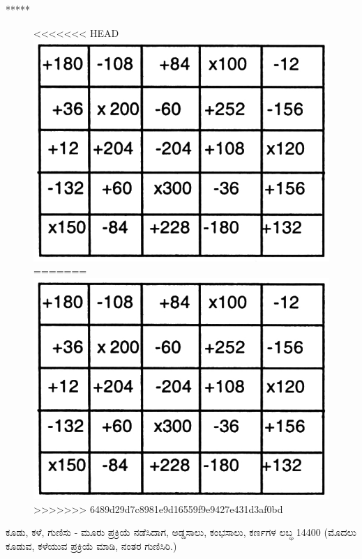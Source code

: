 \begin{center}
*****
\end{center}
\begin{figure}[H]
<<<<<<< HEAD
\includegraphics{src/figures/chap7/fig7-32.jpg}
=======
\includegraphics[scale=0.8]{src/figures/chap7/fig7.32.jpg}
>>>>>>> 6489d29d7c8981e9d16559f9e9427e431d3af0bd
\end{figure}
ಕೂಡು, ಕಳೆ, ಗುಣಿಸು - ಮೂರು ಪ್ರಕ್ರಿಯೆ ನಡೆಸಿದಾಗ, ಅಡ್ಡಸಾಲು, ಕಂಭಸಾಲು, ಕರ್ಣಗಳ ಲಬ್ಧ 14400 (ಮೊದಲು ಕೂಡುವ, ಕಳೆಯುವ ಪ್ರಕ್ರಿಯೆ ಮಾಡಿ, ನಂತರ ಗುಣಿಸಿರಿ.)
